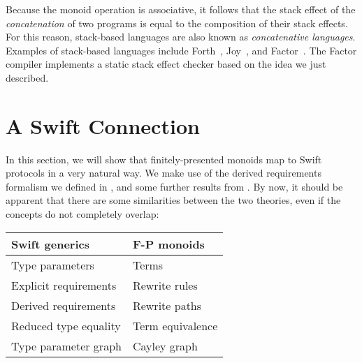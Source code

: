 \documentclass[../generics]{subfiles}
\begin{document}
\begin{example}
Because the monoid operation is associative, it follows that the stack effect of the \emph{concatenation} of two programs is equal to the composition of their stack effects. For this reason, stack-based languages are also known as \emph{concatenative languages}. Examples of stack-based languages include Forth~\cite{forth}, Joy~\cite{joy}, and Factor~\cite{factor}. The Factor compiler implements a static stack effect checker based on the idea we just described.
\end{example}

\section{A Swift Connection}\label{monoidsasprotocols}

In this section, we will show that finitely-presented monoids map to Swift protocols in a very natural way. We make use of the derived requirements formalism we defined in , and some further results from . By now, it should be apparent that there are some similarities between the two theories, even if the concepts do not completely overlap:
\begin{center}
\begin{tabular}{ll}
\toprule
\textbf{Swift generics}&\textbf{F-P monoids}\\
\midrule
Type parameters&Terms\\
Explicit requirements&Rewrite rules\\
Derived requirements&Rewrite paths\\
Reduced type equality&Term equivalence\\
\index{type parameter graph}Type parameter graph&\index{Cayley graph}Cayley graph\\
\bottomrule
\end{tabular}
\end{center}

\newcommand{\GM}{G_\texttt{M}}
\end{document}
